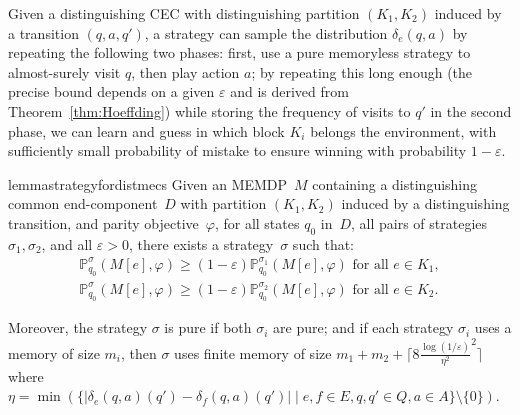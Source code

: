 \documentclass[a4paper,USenglish,cleveref, autoref, thm-restate]{lipics-v2021}
\let\epsilon\varepsilon
\def\abs#1{\ensuremath{\lvert #1 \rvert}}
\newcommand*{\pr}{\mathbb{P}}
\def\Act{A}
\begin{document}
Given a distinguishing CEC with distinguishing partition  $(K_1,K_2)$ induced by a transition $(q,a,q')$, a strategy can sample the distribution
$\delta_e(q,a)$ by repeating the following two phases: first, use a pure memoryless strategy to almost-surely visit $q$, then play action $a$; by repeating this long enough (the precise bound depends on a given $\epsilon$ and is derived from Theorem~\ref{thm:Hoeffding}) while storing the frequency of visits to $q'$ in the second phase, we can learn and guess in which block $K_i$ belongs the environment, with sufficiently small probability of mistake to ensure winning with probability $1-\epsilon$.

\begin{restatable}{lemma}{strategyfordistmecs}
  \label{lemma:strategy-for-dist-mecs}
  Given an MEMDP~$M$ containing a distinguishing common end-component~$D$ with partition $(K_1,K_2)$
  induced by a distinguishing transition, and parity objective~$\varphi$,
	for all states $q_0$ in~$D$, all pairs of strategies $\sigma_1,\sigma_2$, and all $\epsilon>0$, there exists 
	a strategy~$\sigma$ such that:
  \begin{align*}
		\pr_{q_0}^{\sigma}(M[e], \varphi) \geq (1-\epsilon)\pr_{q_0}^{\sigma_1}(M[e], \varphi) \text{ for all } e \in K_1,\\
		\pr_{q_0}^{\sigma}(M[e], \varphi) \geq (1-\epsilon)\pr_{q_0}^{\sigma_2}(M[e], \varphi) \text{ for all } e \in K_2.
	\end{align*}
	
    Moreover, the strategy $\sigma$ is pure if both $\sigma_i$ are pure; and if each strategy $\sigma_i$ uses a memory of size $m_i$,
	then $\sigma$ uses finite memory of size $m_1+m_2+\lceil 8\frac{\log(1/\epsilon)}{\eta^2}^2\rceil$ where \linebreak $\eta=\min\left(\{\abs{\delta_e(q,a)(q') - \delta_{f}(q,a)(q')} \mid e,f \in E, q,q'\in Q, a \in \Act\}\setminus\{0\}\right)$.
\end{restatable}
\end{document}
